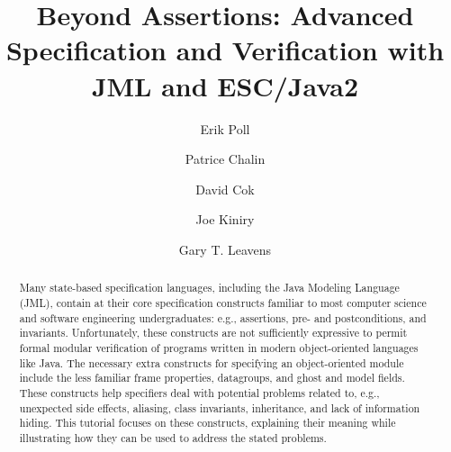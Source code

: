 \documentclass{llncs}
\begin{document}
\title{Beyond Assertions: 
       Advanced Specification and Verification with JML and ESC/Java2}

\author{Erik Poll
        \and Patrice Chalin
        \and David Cok
        \and Joe Kiniry
        \and Gary T. Leavens 
       }



%
\newcommand{\GMARGIN}[1]{\marginpar{\textcolor{blue}{\sf\scriptsize #1}}}
\newcommand{\MARGIN}[1]{\marginpar{\sf\scriptsize #1}}
\newcommand{\COMMENT}[1]{{\sf\scriptsize  #1}}

\newcommand{\figref}[1]{\figurename~\ref{#1}}
\newcommand{\secref}[1]{Section~\ref{#1}}

\newcommand{\extracite}[1]{} %

\maketitle

\begin{abstract}
Many state-based specification languages, including the Java Modeling Language
(JML), contain at their core specification constructs familiar to most
computer science and software engineering undergraduates: e.g., assertions,
pre- and postconditions, and invariants.  Unfortunately, these constructs are
not sufficiently expressive to permit formal modular verification of programs
written in modern object-oriented languages like Java. The necessary extra
constructs for specifying an object-oriented module include the less familiar
frame properties, datagroups, and ghost and model fields.  These constructs
help specifiers deal with potential problems related to, e.g., unexpected side
effects, aliasing, class invariants, inheritance, and lack of information
hiding.
%
This tutorial focuses on these constructs, explaining their meaning while
illustrating how they can be used to address the stated problems.
\end{abstract}
\end{document}
